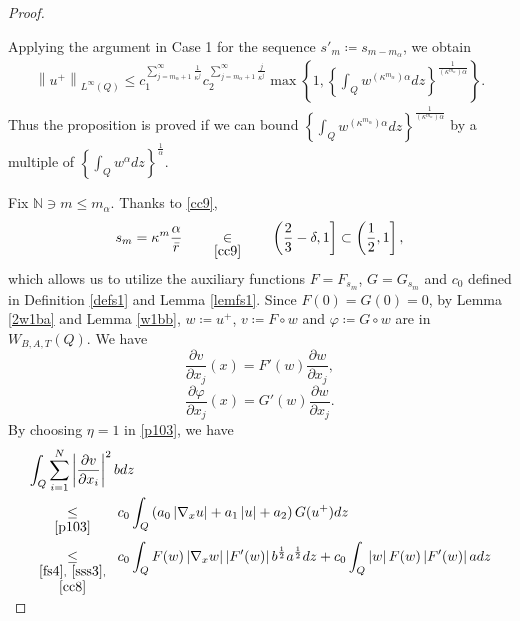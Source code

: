 \documentclass[11pt, a4paper]{article}
\numberwithin{equation}{section}
\newcommand{\coex}[2][\hphantom{longexplanation}]{%
  \underset{{#1}}{\overset{\hphantom{longexplanation}}{#2}}
}
\newcommand{\hk}{\hspace*{.12in}}
\newcommand{\NN}{{\mathbb N}}
\newcommand{\abs}[1]{\left\lvert #1\right\rvert}
\newcommand{\norm}[1]{\left\lVert #1\right\rVert}
\begin{document}
\begin{proof}
\begin{description}[wide]
Applying the argument in Case 1 for the sequence
$s'_m \coloneqq s_{m-m_{\alpha}}$, we obtain
\begin{align}
\label{eq:3}
  \norm{u^{+}}_{L^{\infty}(Q)}
 \le c_{1}^{\sum_{j=m_{\alpha}+1}^{\infty}\frac{1}{\kappa^{j}}}c_{2}^{\sum_{j=m_{\alpha}+1}^{\infty}\frac{j}{\kappa^{j}}}\max\left\{1,\left\{\int_{Q}w^{\left( \kappa^{m_{\alpha}} \right)\alpha}
      dz\right\}^{\frac{1}{\left( \kappa^{m_{\alpha}} \right)\alpha}}\right\}.
\end{align}
Thus the proposition is proved if we can bound $\left\{\int_{Q}w^{\left( \kappa^{m_{\alpha}} \right)\alpha}
      dz\right\}^{\frac{1}{\left( \kappa^{m_{\alpha}} \right)\alpha}}$
    by a multiple of $\left\{ \int_Q w^{\alpha} dz \right\}^{\frac{1}{\alpha}}.$

Fix $\NN \ni m \le m_{\alpha}$. Thanks to \eqref{cc9}, 
\begin{align*}
s_m = \kappa^m \frac{\alpha}{\bar{r}} \coex[\eqref{cc9}]{\in} \left( \frac{2}{3}-\delta,1
  \right] \subset \left( \frac{1}{2}, 1 \right],
\end{align*}
which allows us to utilize the auxiliary functions $F=F_{s_{m}}$,
$G=G_{s_{m}}$ and $c_{0}$ defined in  Definition \ref{defs1} and Lemma
\ref{lemfs1}. Since $F(0)=G(0)=0$, by Lemma \ref{2w1ba} and Lemma
\ref{w1bb}, $w \coloneqq u^{+}$,  $v\coloneqq F\circ w$ and $\varphi\coloneqq G\circ w$ are in $W_{B,A,T}(Q)$.  We have 
 \begin{equation}
 \frac{\partial v}{\partial x_{j}}(x)=  F'(w)\frac{\partial w}{\partial x_{j}},
\label{2le462aazz2}\end{equation}
\begin{equation} \frac{\partial \varphi}{\partial x_{j}}(x)= G'(w)\frac{\partial w}{\partial x_{j}}. 
\label{2le462aazz3}\end{equation}\hk
By choosing $\eta =1$ in \eqref{p103},   we have
\begin{align*}
  \begin{split}
    &\int_{Q}\sum_{i=1}^{N} \abs{\frac{\partial v}{\partial
      x_{i}}}^{2}bdz\\
    &\coex[\eqref{p103}]{\le}
      c_{0}\int_{Q}
      \left(a_{0}\abs{\nabla_{x} u}+a_{1}\abs{u} +a_{2}
      \right)G(u^{+})dz\\
    &\coex[\substack{\eqref{fs4},~\eqref{sss3},\\\eqref{cc8}}]{\le}
      c_{0}\int_{Q}F(w)\abs{\nabla_{x}
      w}\abs{F'(w)}b^{\frac{1}{2}}a^{\frac{1}{2}}dz+
      c_{0}\int_{Q}\abs{w}F(w)\abs{F'(w)} a dz\\[-1em]

\end{split}
\end{align*}
\end{description}
\end{proof}
\end{document}
